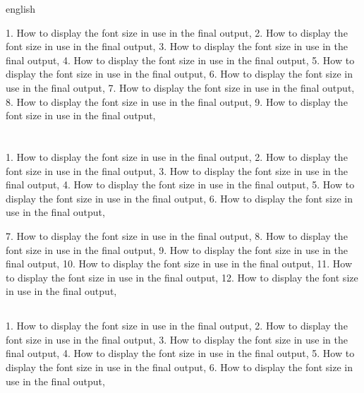 \begin{otherlanguage*}{english}

 

1. How to display the font size in use in the final output,
2. How to display the font size in use in the final output,
3. How to display the font size in use in the final output,
4. How to display the font size in use in the final output,
5. How to display the font size in use in the final output,
6. How to display the font size in use in the final output,
7. How to display the font size in use in the final output,
8. How to display the font size in use in the final output,
9. How to display the font size in use in the final output,


%
\newpage



\section[Some encoding tests]{ }

1. How to display the font size in use in the final output,
2. How to display the font size in use in the final output,
3. How to display the font size in use in the final output,
4. How to display the font size in use in the final output,
5. How to display the font size in use in the final output,
6. How to display the font size in use in the final output,

7. How to display the font size in use in the final output,
8. How to display the font size in use in the final output,
9. How to display the font size in use in the final output,
10. How to display the font size in use in the final output,
11. How to display the font size in use in the final output,
12. How to display the font size in use in the final output,

\subsection{ }

1. How to display the font size in use in the final output,
2. How to display the font size in use in the final output,
3. How to display the font size in use in the final output,
4. How to display the font size in use in the final output,
5. How to display the font size in use in the final output,
6. How to display the font size in use in the final output,


\end{otherlanguage*}
